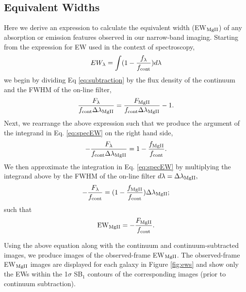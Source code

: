 \documentclass[twocolumn]{aastex62}
\begin{document}
\subsection{Equivalent Widths}\label{subsec.ew}
Here we derive an expression to calculate the equivalent width (EW$_{\rm{MgII}}$) of any absorption or emission features observed in our narrow-band imaging. Starting from the expression for EW used in the context of spectroscopy,
\begin{equation}
EW_{\lambda}=\int (1-\frac{f_{\lambda}}{f_{\rm{cont}}})d\lambda
\label{eq:specEW}
\end{equation}
we begin by dividing Eq \ref{eq:subtraction} by the flux density of the continuum and the FWHM of the on-line filter,
\begin{equation}
\frac{F_{\lambda}}{f_{\rm{cont}}\Delta \lambda_{\rm{MgII}}}=\frac{F_{\rm{MgII}}}{f_{\rm{cont}}\Delta \lambda_{\rm{MgII}}}- 1.
\end{equation}
Next, we rearrange the above expression such that we produce the argument of the integrand in Eq. \ref{eq:specEW} on the right hand side,
\begin{equation}
-\frac{F_{\lambda}}{f_{\rm{cont}}\Delta \lambda_{\rm{MgII}}}=1-\frac{f_{\rm{MgII}}}{f_{\rm{cont}}}.
\end{equation}
We then approximate the integration in Eq. \ref{eq:specEW} by multiplying the integrand above by the FWHM of the on-line filter $d\lambda=\Delta \lambda_{\rm{MgII}},$
\begin{equation}
-\frac{F_{\lambda}}{f_{\rm{cont}}}=(1-\frac{f_{\rm{MgII}}}{f_{\rm{cont}}})\Delta \lambda_{\rm{MgII}};
\end{equation}
such that
\begin{equation}
{\rm EW}_{\rm{MgII}}=-\frac{F_{\rm{MgII}}}{f_{\rm{cont}}}.
\end{equation}

Using the above equation along with the continuum and continuum-subtracted images, we produce images of the observed-frame EW$_{\rm{MgII}}$. The observed-frame EW$_{\rm{MgII}}$ images are displayed for each galaxy in Figure \ref{fig:ews} and show only the EWs within the 1$\sigma$ SB$_1$ contours of the corresponding  images (prior to continuum subtraction). 
\end{document}
